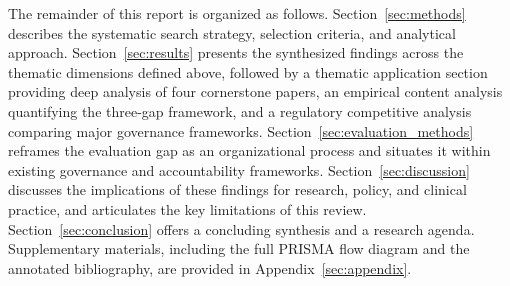 The remainder of this report is organized as follows. Section~\ref{sec:methods} describes the systematic search strategy, selection criteria, and analytical approach. Section~\ref{sec:results} presents the synthesized findings across the thematic dimensions defined above, followed by a thematic application section providing deep analysis of four cornerstone papers, an empirical content analysis quantifying the three-gap framework, and a regulatory competitive analysis comparing major governance frameworks. Section~\ref{sec:evaluation_methods} reframes the evaluation gap as an organizational process and situates it within existing governance and accountability frameworks. Section~\ref{sec:discussion} discusses the implications of these findings for research, policy, and clinical practice, and articulates the key limitations of this review. Section~\ref{sec:conclusion} offers a concluding synthesis and a research agenda. Supplementary materials, including the full PRISMA flow diagram and the annotated bibliography, are provided in Appendix~\ref{sec:appendix}.

